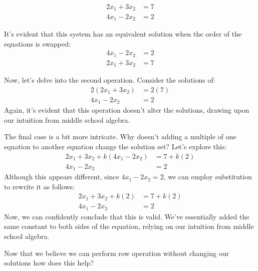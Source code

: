 \documentclass{article}
\begin{document}
\begin{align*}
    2x_1 + 3x_2 &= 7 \\
    4x_1 - 2x_2 &= 2
\end{align*}

It's evident that this system has an equivalent solution when the order of the equations is swapped:
\begin{align*}
    4x_1 - 2x_2 &= 2 \\
    2x_1 + 3x_2 &= 7
\end{align*}

Now, let's delve into the second operation. Consider the solutions of:
\begin{align*}
    2(2x_1 + 3x_2) &= 2(7) \\
    4x_1 - 2x_2 &= 2
\end{align*}
Again, it's evident that this operation doesn't alter the solutions, drawing upon our intuition from middle school algebra.


The final case is a bit more intricate. Why doesn't adding a multiple of one equation to another equation change the solution set? Let's explore this:
\begin{align*}
    2x_1 + 3x_2 + k(4x_1 - 2x_2) &= 7 + k(2) \\
    4x_1 - 2x_2 &= 2
\end{align*}
Although this appears different, since $4x_1 - 2x_2 = 2$, we can employ substitution to rewrite it as follows:
\begin{align*}
    2x_1 + 3x_2 + k(2) &= 7 + k(2) \\
    4x_1 - 2x_2 &= 2
\end{align*}
Now, we can confidently conclude that this is valid. We've essentially added the same constant to both sides of the equation, relying on our intuition from middle school algebra.

Now that we believe we can perform row operation without changing our solutions how does this help?
\end{document}
